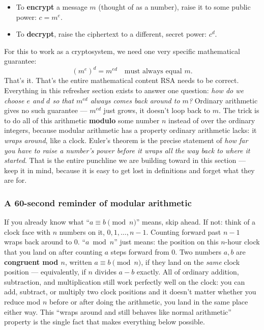 \begin{itemize}
\item To \textbf{encrypt} a message $m$ (thought of as a number), raise it to some public power: $c = m^e$.
\item To \textbf{decrypt}, raise the ciphertext to a different, secret power: $c^d$.
\end{itemize}

For this to work as a cryptosystem, we need one very specific mathematical guarantee:
\[
(m^e)^d = m^{ed} \quad \text{must always equal } m.
\]
That's it. That's the entire mathematical content RSA needs to be correct. Everything in this refresher section exists to answer one question: \emph{how do we choose $e$ and $d$ so that $m^{ed}$ always comes back around to $m$?} Ordinary arithmetic gives no such guarantee — $m^{ed}$ just grows, it doesn't loop back to $m$. The trick is to do all of this arithmetic \textbf{modulo} some number $n$ instead of over the ordinary integers, because modular arithmetic has a property ordinary arithmetic lacks: it \emph{wraps around}, like a clock. Euler's theorem is the precise statement of \emph{how far you have to raise a number's power before it wraps all the way back to where it started}. That is the entire punchline we are building toward in this section — keep it in mind, because it is easy to get lost in definitions and forget what they are for.

\subsubsection*{A 60-second reminder of modular arithmetic}

If you already know what ``$a \equiv b \pmod n$'' means, skip ahead. If not: think of a clock face with $n$ numbers on it, $0,1,\dots,n-1$. Counting forward past $n-1$ wraps back around to $0$. ``$a \bmod n$'' just means: the position on this $n$-hour clock that you land on after counting $a$ steps forward from $0$. Two numbers $a,b$ are \textbf{congruent mod $n$}, written $a\equiv b\pmod n$, if they land on the \emph{same} clock position — equivalently, if $n$ divides $a-b$ exactly. All of ordinary addition, subtraction, and multiplication still work perfectly well on the clock: you can add, subtract, or multiply two clock positions and it doesn't matter whether you reduce mod $n$ before or after doing the arithmetic, you land in the same place either way. This ``wraps around and still behaves like normal arithmetic'' property is the single fact that makes everything below possible.

